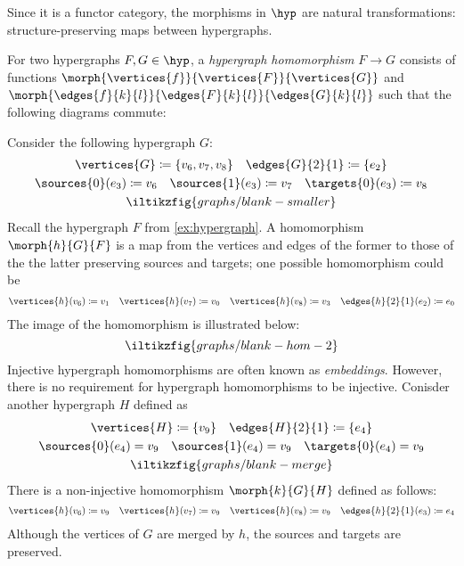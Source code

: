 Since it is a functor category, the morphisms in \(\hyp\) are natural
transformations: structure-preserving maps between hypergraphs.

\begin{definition}\label{def:hypergraph-homomorphism}
    For two hypergraphs \(F, G \in \hyp\), a \emph{hypergraph homomorphism}
    \(F \to G\) consists of functions
    \(\morph{\vertices{f}}{\vertices{F}}{\vertices{G}}\) and
    \(\morph{\edges{f}{k}{l}}{\edges{F}{k}{l}}{\edges{G}{k}{l}}\) such that the
    following diagrams commute:
    
\end{definition}

\begin{example}\label{ex:hypergraph-homomorphism}
    Consider the following hypergraph \(G\):
    \begin{gather*}
        \vertices{G} \coloneqq \{v_6,v_7,v_8\}
        \quad
        \edges{G}{2}{1} \coloneqq \{e_2\}
        \\
        \sources{0}(e_3) \coloneqq v_6
        \quad
        \sources{1}(e_3) \coloneqq v_7
        \quad
        \targets{0}(e_3) \coloneqq v_8
        \\
        \iltikzfig{graphs/blank-smaller}
    \end{gather*}
    Recall the hypergraph \(F\) from \cref{ex:hypergraph}.
    A homomorphism \(\morph{h}{G}{F}\) is a map from the vertices and edges
    of the former to those of the the latter preserving sources and targets;
    one possible homomorphism could be
    \begin{gather*}
        \vertices{h}(v_6) \coloneqq v_1
        \quad
        \vertices{h}(v_7) \coloneqq v_0
        \quad
        \vertices{h}(v_8) \coloneqq v_3
        \quad
        \edges{h}{2}{1}(e_2) \coloneqq e_0
    \end{gather*}
    The image of the homomorphism is illustrated below:
    \[
        \iltikzfig{graphs/blank-hom-2}
    \]
    Injective hypergraph homomorphisms are often known as \emph{embeddings}.
    However, there is no requirement for hypergraph homomorphisms to be
    injective.
    Conisder another hypergraph \(H\) defined as
    \begin{gather*}
        \vertices{H} \coloneqq \{v_9\}
        \quad
        \edges{H}{2}{1} \coloneqq \{e_4\}
        \\
        \sources{0}(e_4) = v_9
        \quad
        \sources{1}(e_4) = v_9
        \quad
        \targets{0}(e_4) = v_9
        \\
        \iltikzfig{graphs/blank-merge}
    \end{gather*}
    There is a non-injective homomorphism \(\morph{k}{G}{H}\) defined as
    follows:
    \begin{gather*}
        \vertices{h}(v_6) \coloneqq v_9
        \quad
        \vertices{h}(v_7) \coloneqq v_9
        \quad
        \vertices{h}(v_8) \coloneqq v_9
        \quad
        \edges{h}{2}{1}(e_3) \coloneqq e_4
    \end{gather*}
    Although the vertices of \(G\) are merged by \(h\), the sources and
    targets are preserved.
\end{example}

